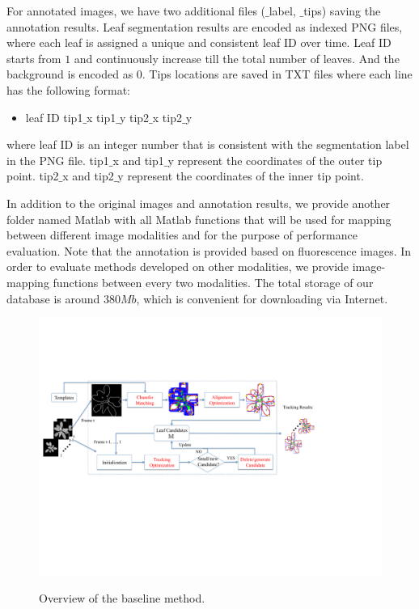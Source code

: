 For annotated images, we have two additional files ($\_$label, $\_$tips) saving the annotation results.
Leaf segmentation results are encoded as indexed PNG files, where each leaf is assigned a unique and consistent leaf ID over time.
Leaf ID starts from $1$ and continuously increase till the total number of leaves.
And the background is encoded as $0$.
Tips locations are saved in TXT files where each line has the following format:
\begin{itemize}
\item leaf ID \quad tip1$\_$x \quad tip1$\_$y \quad tip2$\_$x \quad tip2$\_$y
\end{itemize}
where leaf ID is an integer number that is consistent with the segmentation label in the PNG file.
tip1$\_$x and tip1$\_$y represent the coordinates of the outer tip point.
tip2$\_$x and tip2$\_$y represent the coordinates of the inner tip point.


In addition to the original images and annotation results, we provide another folder named Matlab with all Matlab functions that will be used for mapping between different image modalities and for the purpose of performance evaluation.
Note that the annotation is provided based on fluorescence images.
In order to evaluate methods developed on other modalities, we provide image-mapping functions between every two modalities.
The total storage of our database is around $380 Mb$, which is convenient for downloading via Internet.

\begin{figure}[t!]
\centering
\includegraphics[width=.98\textwidth]{Figures/overview}\\
\caption{Overview of the baseline method.}
\label{fig:methodOverview}
\end{figure}

